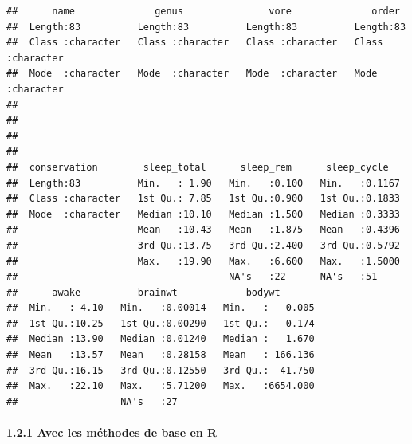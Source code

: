 \documentclass[
]{article}
\begin{document}
\begin{verbatim}
##      name              genus               vore              order          
##  Length:83          Length:83          Length:83          Length:83         
##  Class :character   Class :character   Class :character   Class :character  
##  Mode  :character   Mode  :character   Mode  :character   Mode  :character  
##                                                                             
##                                                                             
##                                                                             
##                                                                             
##  conservation        sleep_total      sleep_rem      sleep_cycle    
##  Length:83          Min.   : 1.90   Min.   :0.100   Min.   :0.1167  
##  Class :character   1st Qu.: 7.85   1st Qu.:0.900   1st Qu.:0.1833  
##  Mode  :character   Median :10.10   Median :1.500   Median :0.3333  
##                     Mean   :10.43   Mean   :1.875   Mean   :0.4396  
##                     3rd Qu.:13.75   3rd Qu.:2.400   3rd Qu.:0.5792  
##                     Max.   :19.90   Max.   :6.600   Max.   :1.5000  
##                                     NA's   :22      NA's   :51      
##      awake          brainwt            bodywt        
##  Min.   : 4.10   Min.   :0.00014   Min.   :   0.005  
##  1st Qu.:10.25   1st Qu.:0.00290   1st Qu.:   0.174  
##  Median :13.90   Median :0.01240   Median :   1.670  
##  Mean   :13.57   Mean   :0.28158   Mean   : 166.136  
##  3rd Qu.:16.15   3rd Qu.:0.12550   3rd Qu.:  41.750  
##  Max.   :22.10   Max.   :5.71200   Max.   :6654.000  
##                  NA's   :27
\end{verbatim}

\hypertarget{avec-les-muxe9thodes-de-base-en-r-1}{%
\paragraph{1.2.1 Avec les méthodes de base en
R}\label{avec-les-muxe9thodes-de-base-en-r-1}}
\end{document}
